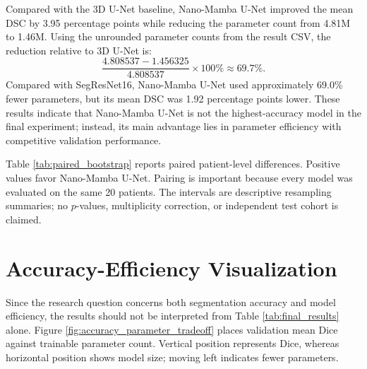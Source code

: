 Compared with the 3D U-Net baseline, Nano-Mamba U-Net improved the mean DSC by 3.95 percentage points while reducing the parameter count from 4.81M to 1.46M. Using the unrounded parameter counts from the result CSV, the reduction relative to 3D U-Net is:
\begin{equation}
    \frac{4.808537-1.456325}{4.808537}\times100\% \approx 69.7\%.
\end{equation}
Compared with SegResNet16, Nano-Mamba U-Net used approximately 69.0\% fewer parameters, but its mean DSC was 1.92 percentage points lower. These results indicate that Nano-Mamba U-Net is not the highest-accuracy model in the final experiment; instead, its main advantage lies in parameter efficiency with competitive validation performance.

Table \ref{tab:paired_bootstrap} reports paired patient-level differences. Positive values favor Nano-Mamba U-Net. Pairing is important because every model was evaluated on the same 20 patients. The intervals are descriptive resampling summaries; no $p$-values, multiplicity correction, or independent test cohort is claimed.

\begin{table}[hbt!]
\caption{Post-hoc paired patient-level Nano-Mamba mean-DSC differences.}
\label{tab:paired_bootstrap}
\centering
{}
\end{table}

\section{Accuracy-Efficiency Visualization}
Since the research question concerns both segmentation accuracy and model efficiency, the results should not be interpreted from Table \ref{tab:final_results} alone. Figure \ref{fig:accuracy_parameter_tradeoff} places validation mean Dice against trainable parameter count. Vertical position represents Dice, whereas horizontal position shows model size; moving left indicates fewer parameters.

